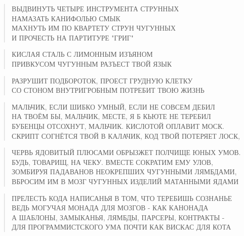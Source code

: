 \poemtitle{***}
\begin{verse}
ВЫДВИНУТЬ ЧЕТЫРЕ ИНСТРУМЕНТА СТРУННЫХ\\
НАМАЗАТЬ КАНИФОЛЬЮ СМЫК\\
МАХНУТЬ ИМ ПО КВАРТЕТУ СТРУН ЧУГУННЫХ\\
И ПРОЧЕСТЬ НА ПАРТИТУРЕ "ГРИГ"
\end{verse}

\poemtitle{***}
\begin{verse}
КИСЛАЯ СТАЛЬ С ЛИМОННЫМ ИЗЪЯНОМ\\
ПРИВКУСОМ ЧУГУННЫМ РАЗЪЕСТ ТВОЙ ЯЗЫК
\end{verse}

\poemtitle{***}
\begin{verse}
РАЗРУШИТ ПОДБОРОТОК, ПРОЕСТ ГРУДНУЮ КЛЕТКУ\\
СО СТОНОМ ВНУТРИГРОБНЫМ ПОТРЕБИТ ТВОЮ ЖИЗНЬ
\end{verse}

\poemtitle{***}
\begin{verse}
МАЛЬЧИК, ЕСЛИ ШИБКО УМНЫЙ, ЕСЛИ НЕ СОВСЕМ ДЕБИЛ\\
НА ТВОЁМ БЫ, МАЛЬЧИК, МЕСТЕ, Я Б КЬЮТЕ НЕ ТЕРЕБИЛ\\
БУБЕНЦЫ ОТСОХНУТ, МАЛЬЧИК. КИСЛОТОЙ ОПЛАВИТ МОСК.\\
СКРИПТ СОГНЁТСЯ ТВОЙ В КАЛАЧИК, КОД ТВОЙ ПОТЕРЯЕТ ЛОСК,
\end{verse}

\poemtitle{***}
\begin{verse}
ЧЕРВЬ ЯДОВИТЫЙ ПЛЮСАМИ ОБРЫЗЖЕТ ПОЛЧИЩЕ ЮНЫХ УМОВ.\\
БУДЬ, ТОВАРИЩ, НА ЧЕКУ. ВМЕСТЕ СОКРАТИМ ЕМУ УЛОВ,\\
ЗОМБИРУЯ ПАДАВАНОВ НЕОКРЕПШИХ ЧУГУННЫМИ ЛЯМБДАМИ,\\
ВБРОСИМ ИМ В МОЗГ ЧУГУННЫХ ИЗДЕЛИЙ МАТАННЫМИ ЯДАМИ
\end{verse}

\poemtitle{***}
\begin{verse}
ПРЕЛЕСТЬ КОДА НАПИСАНЬЯ В ТОМ, ЧТО ТЕРЕБИШЬ СОЗНАНЬЕ\\
ВЕДЬ МОГУЧАЯ МОНАДА ДЛЯ МОЗГОВ - КАК КАНОНАДА\\
А ШАБЛОНЫ, ЗАМЫКАНЬЯ, ЛЯМБДЫ, ПАРСЕРЫ, КОНТРАКТЫ - \\
ДЛЯ ПРОГРАММИСТСКОГО УМА ПОЧТИ КАК ВИСКАС ДЛЯ КОТА
\end{verse}

